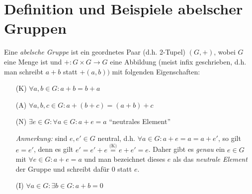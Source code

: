 \documentclass[../../main.tex]{subfiles}
\begin{document}
\section{Definition und Beispiele abelscher Gruppen}

\begin{df}\label{2.1.1}
Eine \emph{abelsche Gruppe} ist ein geordnetes Paar (d.h. 2-Tupel) $(G,+)$, wobei $G$ eine Menge ist und $+:G\times G\rightarrow G$ eine Abbildung (meist infix geschrieben, d.h. man schreibt $a+b$ statt $+(a,b))$ mit folgenden Eigenschaften:
\begin{itemize}
\item[(K)] $\forall a,b\in G : a+b = b+a $ 
\item[(A)] $\forall a,b,c\in G: a+ (b+c) = (a+b)+c$ 
\item[(N)] $\exists e \in G : \forall a\in G: a+e = a$ \qquad
{\small"`neutrales Element"'}

\smallskip\noindent
\emph{Anmerkung:} sind $e,e'\in G$ neutral, d.h. $\forall a\in G: a+e=a=a+e'$, so gilt $e=e'$, denn es gilt
$e'=e'+e\overset{\text{(K)}} = e+e' = e$.
Daher gibt es \emph{genau} ein $e\in G$ mit $\forall e\in G: a+e=a$ und man bezeichnet dieses $e$ als das \emph{neutrale Element} der Gruppe und schreibt dafür $0$ statt $e$.
\item[(I)] $\forall a\in G : \exists b\in G: a+b=0$ 
\end{itemize}
\end{df}
\end{document}
